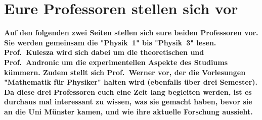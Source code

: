 \section[Eure Profs stellen sich vor]{Eure Professoren stellen sich vor}
\textbf{Auf den folgenden zwei Seiten stellen sich eure beiden Professoren vor.
    Sie werden gemeinsam die "Physik~1" bis "Physik~3" lesen.
    Prof.\ Kulesza wird sich dabei um die theoretischen und Prof.\ Andronic um die experimentellen Aspekte des Studiums kümmern.
    Zudem stellt sich Prof.\ Werner vor, der die Vorlesungen "Mathematik für Physiker" halten wird (ebenfalls über drei Semester).
	Da diese drei Professoren euch eine Zeit lang begleiten werden, ist es durchaus mal interessant zu wissen, was sie gemacht haben, bevor sie an die Uni Münster kamen, und wie ihre aktuelle Forschung aussieht.}

